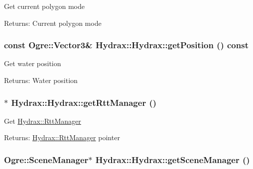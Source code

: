 Get current polygon mode \begin{Desc}
\item[Returns:]Current polygon mode \end{Desc}
\hypertarget{class_hydrax_1_1_hydrax_011da649ae072cce9c6db28620b67a42}{
\subsubsection[{getPosition}]{\setlength{\rightskip}{0pt plus 5cm}const Ogre::Vector3\& Hydrax::Hydrax::getPosition () const}}
\label{class_hydrax_1_1_hydrax_011da649ae072cce9c6db28620b67a42}


Get water position \begin{Desc}
\item[Returns:]Water position \end{Desc}
\hypertarget{class_hydrax_1_1_hydrax_86b446e4a8fdb64e71b3f3f71ea2f68a}{
\subsubsection[{getRttManager}]{$\ast$ Hydrax::Hydrax::getRttManager ()}}
\label{class_hydrax_1_1_hydrax_86b446e4a8fdb64e71b3f3f71ea2f68a}


Get \hyperlink{class_hydrax_1_1_rtt_manager}{Hydrax::RttManager} \begin{Desc}
\item[Returns:]\hyperlink{class_hydrax_1_1_rtt_manager}{Hydrax::RttManager} pointer \end{Desc}
\hypertarget{class_hydrax_1_1_hydrax_4f6dfef270938f04d0430eaf8e1fa88f}{
\subsubsection[{getSceneManager}]{\setlength{\rightskip}{0pt plus 5cm}Ogre::SceneManager$\ast$ Hydrax::Hydrax::getSceneManager ()}}
\label{class_hydrax_1_1_hydrax_4f6dfef270938f04d0430eaf8e1fa88f}


